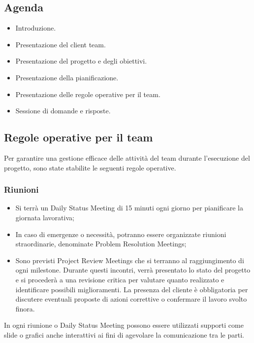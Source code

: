 \documentclass[a4paper,12pt, openright]{report}
\begin{document}
\subsection{Agenda}
\begin{itemize}
    \item Introduzione.
    \item Presentazione del client team.
    \item Presentazione del progetto e degli obiettivi.
    \item Presentazione della pianificazione.
    \item Presentazione delle regole operative per il team.
    \item Sessione di domande e risposte.
\end{itemize}

\subsection{Regole operative per il team}
Per garantire una gestione efficace delle attività del team durante l'esecuzione del progetto, sono state stabilite le seguenti regole operative.

\subsubsection{Riunioni}
\begin{itemize}
    \item Si terrà un Daily Status Meeting di 15 minuti ogni giorno per pianificare la giornata lavorativa;
    \item In caso di emergenze o necessità, potranno essere organizzate riunioni straordinarie, denominate Problem Resolution Meetings;
    \item Sono previsti Project Review Meetings che si terranno al raggiungimento di ogni milestone. Durante questi incontri, verrà presentato lo stato del progetto e si procederà a una revisione critica per valutare quanto realizzato e identificare possibili miglioramenti. La presenza del cliente è obbligatoria per discutere eventuali proposte di azioni correttive o confermare il lavoro svolto finora.
\end{itemize}

In ogni riunione o Daily Status Meeting possono essere utilizzati supporti come slide o grafici anche interattivi ai fini di agevolare la comunicazione tra le parti. 
\end{document}
